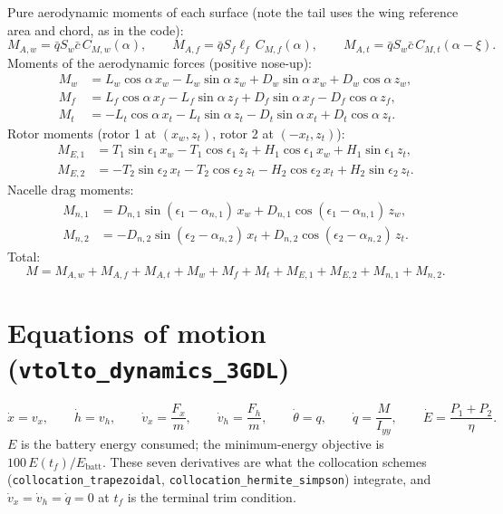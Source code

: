 \documentclass[10pt,a4paper]{article}
\newcommand{\code}[1]{\texttt{\small #1}}
\begin{document}
Pure aerodynamic moments of each surface (note the tail uses the wing reference area and chord, as in the code):
\begin{equation}
M_{A,w} = \bar q S_w \bar c\, C_{M,w}(\alpha), \qquad
M_{A,f} = \bar q S_f \ell_f\, C_{M,f}(\alpha), \qquad
M_{A,t} = \bar q S_w \bar c\, C_{M,t}(\alpha-\xi).
\end{equation}
Moments of the aerodynamic forces (positive nose-up):
\begin{align}
M_w &= L_w\cos\alpha\, x_w - L_w\sin\alpha\, z_w + D_w\sin\alpha\, x_w + D_w\cos\alpha\, z_w, \\
M_f &= L_f\cos\alpha\, x_f - L_f\sin\alpha\, z_f + D_f\sin\alpha\, x_f - D_f\cos\alpha\, z_f, \\
M_t &= -L_t\cos\alpha\, x_t - L_t\sin\alpha\, z_t - D_t\sin\alpha\, x_t + D_t\cos\alpha\, z_t .
\end{align}
Rotor moments (rotor 1 at $(x_w, z_t)$, rotor 2 at $(-x_t, z_t)$):
\begin{align}
M_{E,1} &= T_1\sin\epsilon_1\, x_w - T_1\cos\epsilon_1\, z_t + H_1\cos\epsilon_1\, x_w + H_1\sin\epsilon_1\, z_t, \\
M_{E,2} &= -T_2\sin\epsilon_2\, x_t - T_2\cos\epsilon_2\, z_t - H_2\cos\epsilon_2\, x_t + H_2\sin\epsilon_2\, z_t .
\end{align}
Nacelle drag moments:
\begin{align}
M_{n,1} &= D_{n,1}\sin(\epsilon_1-\alpha_{n,1})\, x_w + D_{n,1}\cos(\epsilon_1-\alpha_{n,1})\, z_w, \\
M_{n,2} &= -D_{n,2}\sin(\epsilon_2-\alpha_{n,2})\, x_t + D_{n,2}\cos(\epsilon_2-\alpha_{n,2})\, z_t .
\end{align}
Total:
\begin{equation}
M = M_{A,w} + M_{A,f} + M_{A,t} + M_w + M_f + M_t + M_{E,1} + M_{E,2} + M_{n,1} + M_{n,2}.
\end{equation}

\section{Equations of motion (\code{vtolto\_dynamics\_3GDL})}

\begin{equation}
\dot x = v_x, \qquad \dot h = v_h, \qquad
\dot v_x = \frac{F_x}{m}, \qquad \dot v_h = \frac{F_h}{m}, \qquad
\dot\theta = q, \qquad \dot q = \frac{M}{I_{yy}}, \qquad
\dot E = \frac{P_1 + P_2}{\eta}.
\end{equation}
$E$ is the battery energy consumed; the minimum-energy objective is $100\,E(t_f)/E_\text{batt}$.
These seven derivatives are what the collocation schemes (\code{collocation\_trapezoidal},
\code{collocation\_hermite\_simpson}) integrate, and $\dot v_x = \dot v_h = \dot q = 0$ at $t_f$ is the terminal trim condition.
\end{document}
